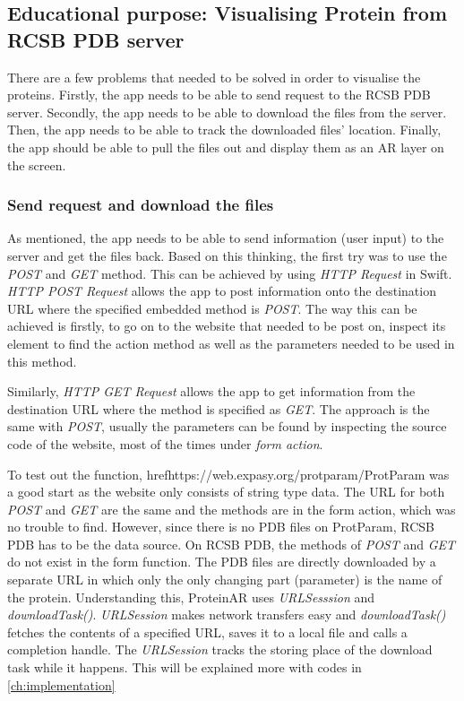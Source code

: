 \subsection{Educational purpose: Visualising Protein from RCSB PDB server}
There are a few problems that needed to be solved in order to visualise the proteins. 
Firstly, the app needs to be able to send request to the RCSB PDB server. Secondly, the app needs to be able to download the files from the server. Then, the app needs to be able to track the downloaded files’ location. Finally, the app should be able to pull the files out and display them as an AR layer on the screen. 
	\subsubsection{Send request and download the files}
As mentioned, the app needs to be able to send information (user input) to the server and get the files back. Based on this thinking, the first try was to use the \emph{POST} and \emph{GET} method. This can be achieved by using \emph{HTTP Request} in Swift. 
\emph{HTTP POST Request} allows the app to post information onto the destination URL where the specified embedded method is \emph{POST}. The way this can be achieved is firstly, to go on to the website that needed to be post on, inspect its element to find the action method as well as the parameters needed to be used in this method. 

Similarly, \emph{HTTP GET Request }allows the app to get information from the destination URL where the method is specified as \emph{GET}. The approach is the same with \emph{POST}, usually the parameters can be found by inspecting the source code of the website, most of the times under \emph{form action}.

To test out the function, href{https://web.expasy.org/protparam/}{ProtParam} was a good start as the website only consists of string type data. The URL for both \emph{POST} and \emph{GET} are the same and the methods are in the form action, which was no trouble to find. 
However, since there is no PDB files on ProtParam, RCSB PDB has to be the data source. On RCSB PDB, the methods of \emph{POST} and \emph{GET} do not exist in the form function. The PDB files are directly downloaded by a separate URL in which only the only changing part (parameter) is the name of the protein. Understanding this, ProteinAR uses \emph{URLSesssion} and \emph{downloadTask()}. \emph{URLSession} makes network transfers easy and \emph{downloadTask()} fetches the contents of a specified URL, saves it to a local file and calls a completion handle. The \emph{URLSession} tracks the storing place of the download task while it happens. This will be explained more with codes in \autoref{ch:implementation}
